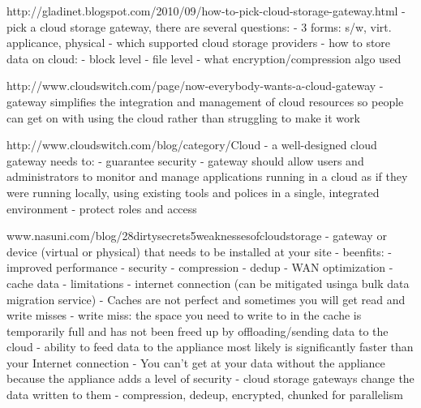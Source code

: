 			http://gladinet.blogspot.com/2010/09/how-to-pick-cloud-storage-gateway.html 
				- pick a cloud storage gateway, there are several questions:
					- 3 forms: s/w, virt. applicance, physical
					- which supported cloud storage providers
					- how to store data on cloud: 
						- block level
						- file level
					- what encryption/compression algo used
					
			http://www.cloudswitch.com/page/now-everybody-wants-a-cloud-gateway
				- gateway simplifies the integration and management of cloud resources so people can get on with using the cloud rather than struggling to make it work
				
			http://www.cloudswitch.com/blog/category/Cloud%
				- a well-designed cloud gateway needs to:
					- guarantee security
					- gateway should allow users and administrators to monitor and manage applications running in a cloud as if they were running locally, using existing tools and polices in a single, integrated environment
					- protect roles and access
					
www.nasuni.com/blog/28dirtysecrets5weaknessesofcloudstorage  
				- gateway or device (virtual or physical) that needs to be installed at your site
				- beenfits:
					- improved performance
					- security
					- compression
					- dedup
					- WAN optimization
					- cache data
				- limitations
					- internet connection (can be mitigated usinga bulk data migration service)
					- Caches are not perfect and sometimes you will get read and write misses 
						- write miss: the space you need to write to in the cache is temporarily full and has not been freed up by offloading/sending data to the cloud
							-  ability to feed data to the appliance most likely is significantly faster than your Internet connection 
					- You can't get at your data without the appliance because the appliance adds a level of security
				- cloud storage gateways change the data written to them
					- compression, dedeup, encrypted, chunked for parallelism
					
